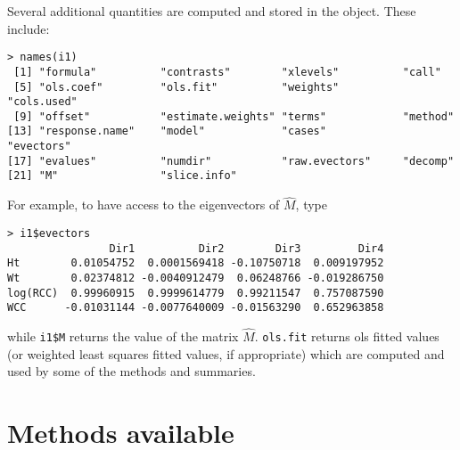 \documentclass{article}
\newcommand{\dcode}[1]{{\small{\tt #1}}}
\begin{document}
Several additional quantities are computed and stored in the object.  These
include:
\small
\begin{verbatim}
> names(i1)
 [1] "formula"          "contrasts"        "xlevels"          "call"
 [5] "ols.coef"         "ols.fit"          "weights"          "cols.used"
 [9] "offset"           "estimate.weights" "terms"            "method"
[13] "response.name"    "model"            "cases"            "evectors"
[17] "evalues"          "numdir"           "raw.evectors"     "decomp"
[21] "M"                "slice.info"
\end{verbatim}
\normalsize
\noindent
For example, to have access to the eigenvectors of $\hat{M}$, type
\small\begin{verbatim}
> i1$evectors
                Dir1          Dir2        Dir3         Dir4
Ht        0.01054752  0.0001569418 -0.10750718  0.009197952
Wt        0.02374812 -0.0040912479  0.06248766 -0.019286750
log(RCC)  0.99960915  0.9999614779  0.99211547  0.757087590
WCC      -0.01031144 -0.0077640009 -0.01563290  0.652963858
\end{verbatim}
\normalsize
\noindent while {\small \verb+i1$M+} %
returns the value of the matrix $\hat{M}$.  \dcode{ols.fit} returns ols
fitted values (or weighted least squares fitted values, if appropriate)
which are computed and used by some of the methods and summaries.

\section{Methods available}
\end{document}
